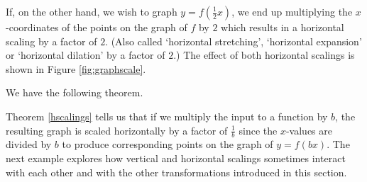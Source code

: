 If, on the other hand, we wish to graph $y = f\left( \frac{1}{2} x\right)$, we end up multiplying the $x$-coordinates of the points on the graph of $f$ by $2$ which results in a horizontal scaling by a factor of $2$. (Also called `horizontal stretching', `horizontal expansion' or `horizontal dilation' by a factor of $2$.) The effect of both horizontal scalings is shown in Figure \ref{fig:graphscale}.


We have the following theorem.

\smallskip


\smallskip

Theorem \ref{hscalings} tells us that if we multiply the input to a function by $b$, the resulting graph is scaled horizontally by a factor of $\frac{1}{b}$ since the $x$-values are divided by $b$ to produce corresponding points on the graph of $y = f(bx)$.    The next example explores how vertical and horizontal scalings sometimes interact with each other and with the other transformations introduced in this section. 

\medskip

